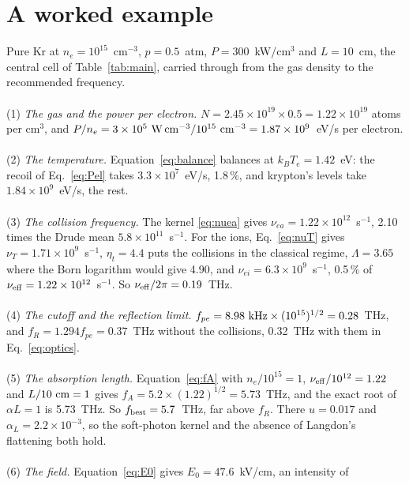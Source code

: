\documentclass[11pt]{article}
\numberwithin{equation}{section}
\newcommand{\nuT}{\nu_T}
\newcommand{\nueff}{\nu_{\rm eff}}
\newcommand{\nuea}{\nu_{ea}}
\newcommand{\nuei}{\nu_{ei}}
\newcommand{\kB}{k_B}
\newcommand{\fbest}{f_{\rm best}}
\newcommand{\Te}{T_e}
\begin{document}
\section{A worked example}
\label{sec:example}
Pure Kr at $n_e=10^{15}$~cm$^{-3}$, $p=0.5$~atm, $P=300$~kW/cm$^3$ and $L=10$~cm, the central cell
of Table~\ref{tab:main}, carried through from the gas density to the recommended frequency.
\\ \\
{\noindent}(1) \emph{The gas and the power per electron.} $N=2.45\times10^{19}\times0.5=1.22\times10^{19}$
atoms per cm$^3$, and $P/n_e=3\times10^{5}~{\rm W\,cm^{-3}}/10^{15}~{\rm cm^{-3}}=1.87\times10^{9}$~eV/s
per electron.
\\ \\
{\noindent}(2) \emph{The temperature.} Equation~\eqref{eq:balance} balances at $\kB\Te=1.42$~eV:
the recoil of Eq.~\eqref{eq:Pel} takes $3.3\times10^{7}$~eV/s, 1.8\,\%, and krypton's levels take
$1.84\times10^{9}$~eV/s, the rest.
\\ \\
{\noindent}(3) \emph{The collision frequency.} The kernel \eqref{eq:nuea} gives
$\nuea=1.22\times10^{12}$~s$^{-1}$, 2.10 times the Drude mean $5.8\times10^{11}$~s$^{-1}$. For the
ions, Eq.~\eqref{eq:nuT} gives $\nuT=1.71\times10^{9}$~s$^{-1}$, $\eta_t=4.4$ puts the collisions in
the classical regime, $\Lambda=3.65$ where the Born logarithm would give 4.90, and
$\nuei=6.3\times10^{9}$~s$^{-1}$, 0.5\,\% of $\nueff=1.22\times10^{12}$~s$^{-1}$. So
$\nueff/2\pi=0.19$~THz.
\\ \\
{\noindent}(4) \emph{The cutoff and the reflection limit.} $f_{pe}=8.98~{\rm kHz}\times(10^{15})^{1/2}
=0.28$~THz, and $f_R=1.294f_{pe}=0.37$~THz without the collisions, 0.32~THz with them in
Eq.~\eqref{eq:optics}.
\\ \\
{\noindent}(5) \emph{The absorption length.} Equation~\eqref{eq:fA} with $n_e/10^{15}=1$,
$\nueff/10^{12}=1.22$ and $L/10~{\rm cm}=1$ gives $f_A=5.2\times(1.22)^{1/2}=5.73$~THz, and the exact
root of $\alpha L=1$ is 5.73~THz. So $\fbest=5.7$~THz, far above $f_R$. There $u=0.017$ and
$\alpha_L=2.2\times10^{-3}$, so the soft-photon kernel and the absence of Langdon's flattening both
hold.
\\ \\
{\noindent}(6) \emph{The field.} Equation~\eqref{eq:E0} gives $E_0=47.6$~kV/cm, an intensity of
\end{document}
